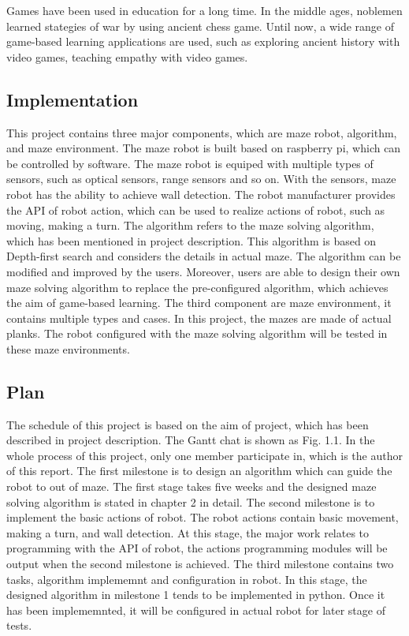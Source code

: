 \documentclass[11pt,times,oneside,openright,hardcopy]{eeereport}
\begin{document}
Games have been used in education for a long time. In the middle ages, noblemen learned stategies of war by using ancient chess game. Until now, a wide range of game-based learning applications are used, such as exploring ancient history with video games, teaching empathy with video games.


\subsection{Implementation}
This project contains three major components, which are maze robot, algorithm, and maze environment.
The maze robot is built based on raspberry pi, which can be controlled by software. The maze robot is equiped with multiple types of sensors, such as optical sensors, range sensors and so on. With the sensors, maze robot has the ability to achieve wall detection. The robot manufacturer provides the API of robot action, which can be used to realize actions of robot, such as moving, making a turn.
The algorithm refers to the maze solving algorithm, which has been mentioned in project description. This algorithm is based on Depth-first search and considers the details in actual maze. The algorithm can be modified and improved by the users. Moreover, users are able to design their own maze solving algorithm to replace the pre-configured algorithm, which achieves the aim of game-based learning.
The third component are maze environment, it contains multiple types and cases. In this project, the mazes are made of actual planks. The robot configured with the maze solving algorithm will be tested in these maze environments.
\subsection{Plan}
The schedule of this project is based on the aim of project, which has been described in project description. The Gantt chat is shown as Fig. 1.1. In the whole process of this project, only one member participate in, which is the author of this report.
The first milestone is to design an algorithm which can guide the robot to out of maze. The first stage takes five weeks and the designed maze solving algorithm is stated in chapter 2 in detail. 
The second milestone is to implement the basic actions of robot. The robot actions contain basic movement, making a turn, and wall detection. At this stage, the major work relates to programming with the API of robot, the actions programming modules will be output when the second milestone is achieved.
The third milestone contains two tasks, algorithm implememnt and configuration in robot. In this stage, the designed algorithm in milestone 1 tends to be implemented in python. Once it has been implememnted, it will be configured in actual robot for later stage of tests.
\end{document}
